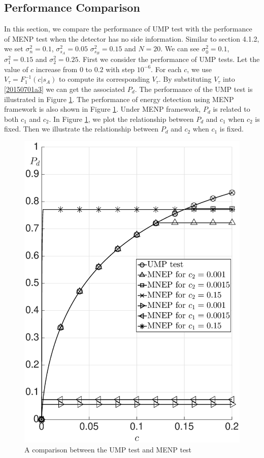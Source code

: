 \subsection{Performance Comparison}
In this section, we compare the performance of UMP test with the performance of MENP test when the detector has no side information.
Similar to section 4.1.2, we set $\sigma_n^2= 0.1$, $\sigma_{s_A}^2 = 0.05$ $\sigma_{s_B}^2 = 0.15$ and $N=20$. We can see $\sigma_0^2 = 0.1$, $\sigma_1^2=0.15$ and $\sigma_2^2 = 0.25$. 
First we consider the performance of UMP tests. 
Let the value of $c$ increase from $0$ to $0.2$ with step $10^{-6}$. For each $c$, we use $V_\tau = F_1^{-1}(c|s_A)$ to compute its corresponding $V_\tau$. By substituting $V_\tau$ into \eqref{20150701a3} we can get the associated $P_d$. The performance of the UMP test is illustrated in Figure \ref{pic:20150701a0}. 
The performance of energy detection using MENP framework is also shown in Figure \ref{pic:20150701a0}. Under MENP framework, $P_d$ is related to both $c_1$ and $c_2$. In Figure \ref{pic:20150701a0}, we plot the relationship between $P_d$ and $c_1$ when $c_2$ is fixed. Then we illustrate the relationship between $P_d$ and $c_2$ when $c_1$ is fixed.   

\begin{figure}[!hbp]
\centering
\includegraphics[width = 14cm]{5/noSI.eps}
\caption{A comparison between the UMP test and MENP test}
\label{pic:20150701a0}
\end{figure}


